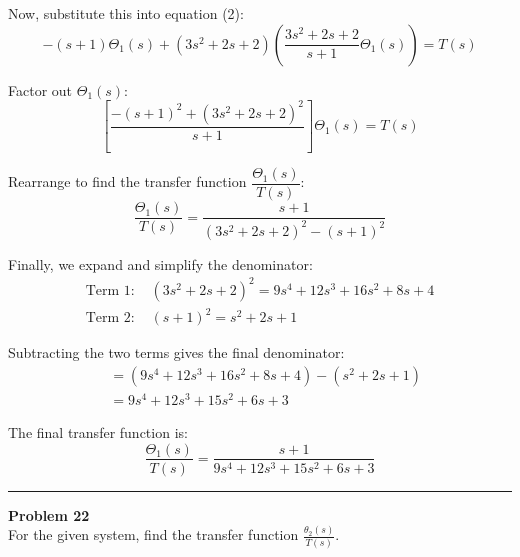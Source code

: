 \documentclass[11pt]{article}
\begin{document}
Now, substitute this into equation (2):
\[
-(s + 1)\Theta_1(s) + (3s^2 + 2s + 2) \left( \frac{3s^2 + 2s + 2}{s + 1} \Theta_1(s) \right) = T(s)
\]

Factor out $\Theta_1(s)$:
\[
\left[ \frac{-(s + 1)^2 + (3s^2 + 2s + 2)^2}{s + 1} \right] \Theta_1(s) = T(s)
\]

Rearrange to find the transfer function $\dfrac{\Theta_1(s)}{T(s)}$:
\[
\frac{\Theta_1(s)}{T(s)} = \frac{s + 1}{(3s^2 + 2s + 2)^2 - (s + 1)^2}
\]

Finally, we expand and simplify the denominator:
\begin{align*}
    \text{Term 1: } & (3s^2 + 2s + 2)^2 = 9s^4 + 12s^3 + 16s^2 + 8s + 4 \\
    \text{Term 2: } & (s + 1)^2 = s^2 + 2s + 1
\end{align*}

Subtracting the two terms gives the final denominator:
\begin{align*}
&= (9s^4 + 12s^3 + 16s^2 + 8s + 4) - (s^2 + 2s + 1) \\
&= 9s^4 + 12s^3 + 15s^2 + 6s + 3
\end{align*}

The final transfer function is:
\[
\boxed{\frac{\Theta_1(s)}{T(s)} = \frac{s + 1}{9s^4 + 12s^3 + 15s^2 + 6s + 3}}
\]




\newpage
  \setcounter{page}{42}  
\noindent\rule{\textwidth}{1pt}
\noindent\textbf{Problem 22} \hfill 
\\ For the given system, find the transfer function $\frac{\theta_2(s)}{T(s)}$.
\end{document}
